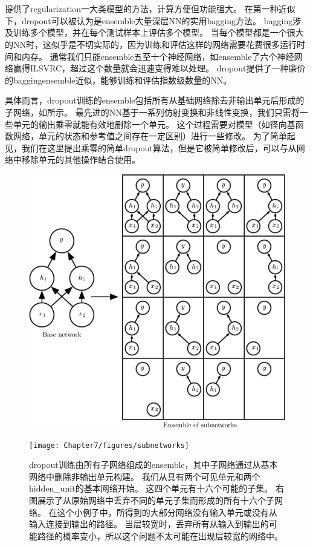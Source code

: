 \section{}
\label{sec:dropout}
\citep{Srivastava-et-al-2014}提供了\gls{regularization}一大类模型的方法，计算方便但功能强大。
在第一种近似下，\gls{dropout}可以被认为是\gls{ensemble}大量深层\gls{NN}的实用\gls{bagging}方法。
\gls{bagging}涉及训练多个模型，并在每个测试样本上评估多个模型。
当每个模型都是一个很大的\gls{NN}时，这似乎是不切实际的，因为训练和评估这样的网络需要花费很多运行时间和内存。
通常我们只能\gls{ensemble}五至十个神经网络，如\cite{Szegedy-et-al-2014a}\gls{ensemble}了六个神经网络赢得ILSVRC，超过这个数量就会迅速变得难以处理。
\gls{dropout}提供了一种廉价的\gls{bagging}\gls{ensemble}近似，能够训练和评估指数级数量的\gls{NN}。

具体而言，\gls{dropout}训练的\gls{ensemble}包括所有从基础网络除去非输出单元后形成的子网络，如所示。
最先进的\gls{NN}基于一系列仿射变换和非线性变换，我们只需将一些单元的输出乘零就能有效地删除一个单元。
这个过程需要对模型（如径向基函数网络，单元的状态和参考值之间存在一定区别）进行一些修改。
为了简单起见，我们在这里提出乘零的简单\gls{dropout}算法，但是它被简单修改后，可以与从网络中移除单元的其他操作结合使用。
\begin{figure}[!htb]
\ifOpenSource
\centerline{\includegraphics[scale=0.5]{images/59.png}}
\else
\centerline{\texttt{[image: Chapter7/figures/subnetworks]}}
\fi
\caption{\gls{dropout}训练由所有子网络组成的\gls{ensemble}，其中子网络通过从基本网络中删除非输出单元构建。
我们从具有两个可见单元和两个\gls{hidden_unit}的基本网络开始。
这四个单元有十六个可能的子集。
右图展示了从原始网络中丢弃不同的单元子集而形成的所有十六个子网络。
在这个小例子中，所得到的大部分网络没有输入单元或没有从输入连接到输出的路径。
当层较宽时，丢弃所有从输入到输出的可能路径的概率变小，所以这个问题不太可能在出现层较宽的网络中。}
\label{fig:chap7_subnetworks}
\end{figure}

